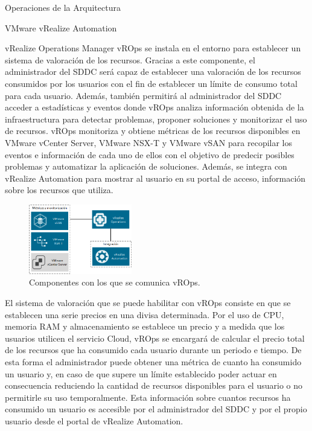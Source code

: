 \begin{subsection}{Operaciones de la Arquitectura}
\begin{subsubsection}{VMware vRealize Automation}
    \end{subsubsection}
    \begin{subsubsection}{vRealize Operations Manager}
        vROps se instala en el entorno para establecer un sistema de valoración de los recursos. Gracias a este componente, el administrador del SDDC será capaz de establecer una valoración de los recursos consumidos por los usuarios con el fin de establecer un límite de consumo total para cada usuario. Además, también permitirá al administrador del SDDC acceder a estadísticas y eventos donde vROps analiza información obtenida de la infraestructura para detectar problemas, proponer soluciones y monitorizar el uso de recursos. vROps monitoriza y obtiene métricas de los recursos disponibles en VMware vCenter Server, VMware NSX-T y VMware vSAN para recopilar los eventos e información de cada uno de ellos con el objetivo de predecir posibles problemas y automatizar la aplicación de soluciones. Además, se integra con vRealize Automation para mostrar al usuario en su portal de acceso, información sobre los recursos que utiliza.
        \\
        \begin{figure}[h]
            \centering
            \includegraphics[width=0.4\textwidth]{imaxes/pruebaconcepto/vrealize/estructura-vrops.png}
            \caption{Componentes con los que se comunica vROps.}
            \label{fig:vrops-components}
        \end{figure}
        \FloatBarrier
        El sistema de valoración que se puede habilitar con vROps consiste en que se establecen una serie precios en una divisa determinada. Por el uso de CPU, memoria RAM y almacenamiento se establece un precio y a medida que los usuarios utilicen el servicio Cloud, vROps se encargará de calcular el precio total de los recursos que ha consumido cada usuario durante un periodo e tiempo. De esta forma el administrador puede obtener una métrica de cuanto ha consumido un usuario y, en caso de que supere un límite establecido poder actuar en consecuencia reduciendo la cantidad de recursos disponibles para el usuario o no permitirle su uso temporalmente. Esta información sobre cuantos recursos ha consumido un usuario es accesible por el administrador del SDDC y por el propio usuario desde el portal de vRealize Automation.

\end{subsubsection}
\end{subsection}
